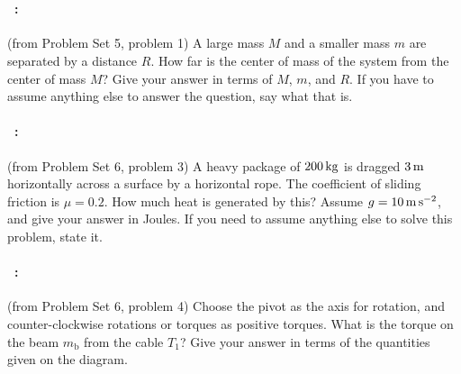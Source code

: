 \documentclass[12pt]{article} 
\begin{document}
\vfill
~
\clearpage
\paragraph{\problemname~\theproblem:}%
(from Problem Set 5, problem 1) A large mass $M$ and a smaller mass
$m$ are separated by a distance $R$. How far is the center of mass of
the system from the center of mass $M$? Give your answer in terms of
$M$, $m$, and $R$. If you have to assume anything else to answer the
question, say what that is.

\vfill

\paragraph{\problemname~\theproblem:}%
(from Problem Set 6, problem 3) A heavy package of $200\,\mathrm{kg}$ is
dragged $3\,\mathrm{m}$ horizontally across a surface by a horizontal
rope. The coefficient of sliding friction is $\mu = 0.2$. How much
heat is generated by this?  Assume $g = 10\,\mathrm{m}\,\mathrm{s}^{-2}$, and give your
answer in Joules. If you need to assume anything else to solve this
problem, state it.

\vfill

\paragraph{\problemname~\theproblem:}%
(from Problem Set 6, problem 4) Choose the pivot as the axis for
rotation, and counter-clockwise rotations or torques as positive
torques. What is the torque on the beam $m_\mathrm{b}$ from the cable $T_1$?
Give your answer in terms of the quantities given on the diagram.

\vfill
~
\end{document}
